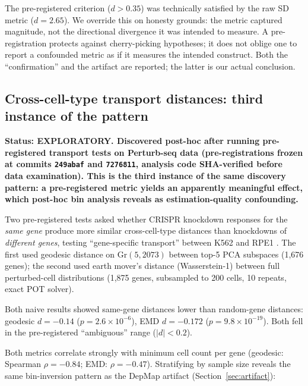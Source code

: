 \documentclass[11pt]{article}
\begin{document}
The pre-registered criterion ($d > 0.35$) was technically satisfied by
the raw SD metric ($d = 2.65$). We override this on honesty grounds: the
metric captured magnitude, not the directional divergence it was
intended to measure. A pre-registration protects against cherry-picking
hypotheses; it does not oblige one to report a confounded metric as if
it measures the intended construct. Both the ``confirmation'' and the
artifact are reported; the latter is our actual conclusion.

\subsection{Cross-cell-type transport distances: third instance of the pattern}
\label{sec:ot_confound}

\textbf{Status: EXPLORATORY. Discovered post-hoc after running
pre-registered transport tests on Perturb-seq data (pre-registrations
frozen at commits \texttt{249abaf} and \texttt{7276811}, analysis code
SHA-verified before data examination). This is the third instance of
the same discovery pattern: a pre-registered metric yields an
apparently meaningful effect, which post-hoc bin analysis reveals as
estimation-quality confounding.}

Two pre-registered tests asked whether CRISPR knockdown responses for
the \emph{same gene} produce more similar cross-cell-type distances
than knockdowns of \emph{different genes}, testing ``gene-specific
transport'' between K562 and RPE1 \citep{replogle2022mapping}.
The first used geodesic distance on $\text{Gr}(5, 2073)$ between
top-5 PCA subspaces (1{,}676 genes); the second used earth mover's
distance (Wasserstein-1) between full perturbed-cell distributions
(1{,}875 genes, subsampled to 200 cells, 10 repeats, exact POT solver).

Both naive results showed same-gene distances lower than random-gene
distances: geodesic $d = -0.14$ ($p = 2.6 \times 10^{-6}$), EMD
$d = -0.172$ ($p = 9.8 \times 10^{-19}$). Both fell in the
pre-registered ``ambiguous'' range ($|d| < 0.2$).

Both metrics correlate strongly with minimum cell count per gene
(geodesic: Spearman $\rho = -0.84$; EMD: $\rho = -0.47$). Stratifying
by sample size reveals the same bin-inversion pattern as the DepMap
artifact (Section~\ref{sec:artifact}):
\end{document}

